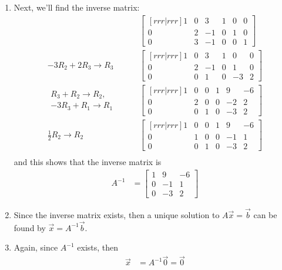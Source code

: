 \begin{example}
\begin{enumerate}
\item Next, we'll find the inverse matrix:
%
\begin{align*}
\qquad & \begin{bmatrix}[rrr|rrr]
1 & 0 & 3 & 1 & 0 & 0\\
0 & 2 & -1 & 0 & 1 &0 \\
0 & 3 & -1 & 0 & 0 & 1
\end{bmatrix} \\
-3 R_2 +2 R_3 \rightarrow R_3 \qquad &
\begin{bmatrix}[rrr|rrr]
1 & 0 & 3 & 1 & 0 & 0\\
0 & 2 & -1 & 0 & 1 &0 \\
0 & 0 & 1 & 0 & -3 & 2
\end{bmatrix} \\
\begin{array}{r}
R_3 + R_2 \rightarrow R_2, \\
-3R_3 + R_1 \rightarrow R_1
\end{array} \qquad & 
\begin{bmatrix}[rrr|rrr]
1 & 0 & 0 & 1 & 9 & -6\\
0 & 2 & 0 & 0 & -2 &2 \\
0 & 0 & 1 & 0 & -3 & 2
\end{bmatrix} \\
\frac{1}{2} R_2 \rightarrow R_2 \qquad &
\begin{bmatrix}[rrr|rrr]
1 & 0 & 0 & 1 & 9 & -6\\
0 & 1 & 0 & 0 & -1 & 1 \\
0 & 0 & 1 & 0 & -3 & 2
\end{bmatrix} \\
\end{align*}
and this shows that the inverse matrix is
%
\begin{align*}
A^{-1} &= \begin{bmatrix}
1 & 9 & -6\\
0 & -1 & 1 \\
0 & -3 & 2
\end{bmatrix}
\end{align*}

\item Since the inverse matrix exists, then a unique solution to $A\vec{x}=\vec{b}$ can be found by $\vec{x}=A^{-1}\vec{b}$.  

\item Again, since $A^{-1}$ exists, then 
%
\begin{align*}
\vec{x} & = A^{-1}\vec{0} = \vec{0}
\end{align*}


\end{enumerate}
\end{example}
